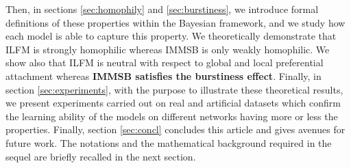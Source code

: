 Then, in sections  \ref{sec:homophily} and \ref{sec:burstiness}, we introduce formal definitions of these properties
within the Bayesian framework, and we study how each model
is able to capture this property. We theoretically demonstrate that ILFM is strongly homophilic whereas IMMSB is only weakly homophilic. We show also that ILFM is neutral with respect to global
and local preferential attachment whereas \textbf{IMMSB satisfies the burstiness effect}.  Finally, in section \ref{sec:experiments}, with the purpose to illustrate these theoretical results, we present experiments carried out on real and artificial datasets which confirm the  learning ability of the models on different networks having more or less the properties. Finally, section \ref{sec:concl} concludes this article and gives avenues for future
work. The notations and the mathematical background required in the sequel are briefly recalled in the next section.
 
